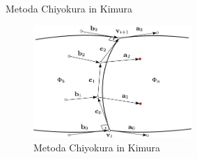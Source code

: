 \documentclass[a4paper,8pt]{beamer}
\begin{document}
\begin{frame}{Metoda Chiyokura in Kimura}
	
\end{frame}
\begin{frame}
	\begin{figure}[h]
		\centering
		\includegraphics[width=6cm]{metoda_CinK.jpg}
		\caption{Metoda Chiyokura in Kimura}
	\end{figure}
\end{frame}
\end{document}
